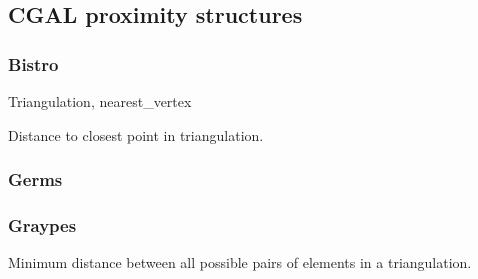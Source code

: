\documentclass[10pt,a4paper,landscape,twocolumn,twoside]{article}
\begin{document}

	\newpage
	\subsection{CGAL proximity structures}
	\label{sub:CGAL proximity structures}

		\subsubsection{Bistro}
		\label{subs:Bistro}
		\begin{keywords}Triangulation, nearest\_vertex\end{keywords}
		Distance to closest point in triangulation.
		

		\subsubsection{Germs}
		\label{subs:Germs}
		\begin{keywords}\end{keywords}
		

		\subsubsection{Graypes}
		\label{subs:Graypes}
		\begin{keywords}\end{keywords}
		Minimum distance between all possible pairs of elements in a triangulation.
		
\end{document}
